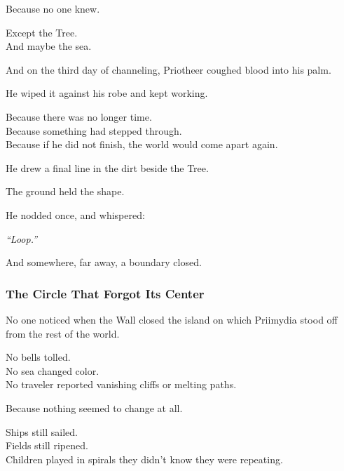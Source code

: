 \documentclass[12pt]{article}
\begin{document}
\vspace{0.5em}
Because no one knew.

\vspace{0.5em}
Except the Tree.\\
And maybe the sea.

\vspace{0.5em}
And on the third day of channeling, Priotheer coughed blood into his palm.

\vspace{0.5em}
He wiped it against his robe and kept working.

\vspace{0.5em}
Because there was no longer time.\\
Because something had stepped through.\\
Because if he did not finish, the world would come apart again.

\vspace{0.5em}
He drew a final line in the dirt beside the Tree.

\vspace{0.5em}
The ground held the shape.

\vspace{0.5em}
He nodded once, and whispered:

\vspace{0.5em}
\textit{``Loop.''}

\vspace{0.5em}
And somewhere, far away, a boundary closed.

\dotfill

\subsubsection*{The Circle That Forgot Its Center}

No one noticed when the Wall closed the island on which Priimydia stood off from the rest of the world.

\vspace{0.5em}
No bells tolled.\\
No sea changed color.\\
No traveler reported vanishing cliffs or melting paths.

\vspace{0.5em}
Because nothing seemed to change at all.

\vspace{0.5em}
Ships still sailed.\\
Fields still ripened.\\
Children played in spirals they didn’t know they were repeating.
\end{document}
